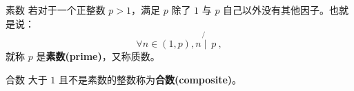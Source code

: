 
\begin{definition}{素数}
若对于一个正整数 $p > 1$，满足 $p$ 除了 $1$ 与 $p$ 自己以外没有其他因子。也就是说：
\begin{equation}
\forall n \in (1,p), n \not{\mid} ~ p ~,
\end{equation}
就称 $p$ 是\textbf{素数(prime)}，又称质数。
\end{definition}

\begin{definition}{合数}
大于 $1$ 且不是素数的整数称为\textbf{合数(composite)}。
\end{definition}